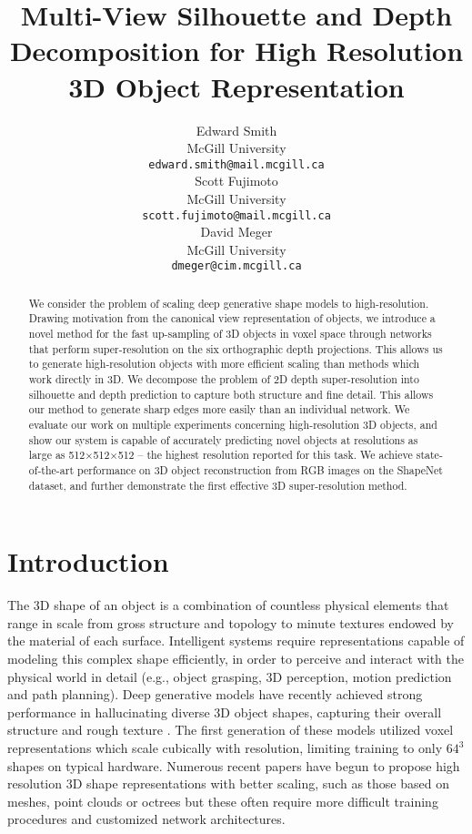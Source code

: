 \documentclass{article}
\title{Multi-View Silhouette and Depth Decomposition for High Resolution 3D Object Representation}
\author{
	Edward Smith \\
    McGill University \\
    \texttt{edward.smith@mail.mcgill.ca} \\
    \And
    Scott Fujimoto \\
    McGill University \\
    \texttt{scott.fujimoto@mail.mcgill.ca} \\
    \And
    David Meger \\
    McGill University \\
    \texttt{dmeger@cim.mcgill.ca} \\
}
\begin{document}
\maketitle

\begin{abstract}
We consider the problem of scaling deep generative shape models to high-resolution. Drawing motivation from the canonical view representation of objects, we introduce a novel method for the fast up-sampling of 3D objects in voxel space through networks that perform super-resolution on the six orthographic depth projections. This allows us to generate high-resolution objects with more efficient scaling than methods which work directly in 3D. We decompose the problem of 2D depth super-resolution into silhouette and depth prediction to capture both structure and fine detail. This allows our method to generate sharp edges more easily than an individual network. We evaluate our work on multiple experiments concerning high-resolution 3D objects, and show our system is capable of accurately predicting novel objects at resolutions as large as 512$\mathbf{\times}$512$\mathbf{\times}$512 -- the highest resolution reported for this task. We achieve state-of-the-art performance on 3D object reconstruction from RGB images on the ShapeNet dataset, and further demonstrate the first effective 3D super-resolution method. 
\end{abstract}

\section{Introduction}
The 3D shape of an object is a combination of countless physical elements that range in scale from gross structure and topology to minute textures endowed by the material of each surface. Intelligent systems require representations capable of modeling this complex shape efficiently, in order to perceive and interact with the physical world in detail (e.g., object grasping, 3D perception, motion prediction and path planning). Deep generative models have recently achieved strong performance in hallucinating diverse 3D object shapes, capturing their overall structure and rough texture \cite{choy20163d,sharma2016vconv,3DGAN}. The first generation of these models utilized voxel representations which scale cubically with resolution, limiting training to only $64^3$ shapes on typical hardware. Numerous recent papers have begun to propose high resolution 3D shape representations with better scaling, such as those based on meshes, point clouds or octrees but these often require more difficult training procedures and customized network architectures. 
\end{document}
